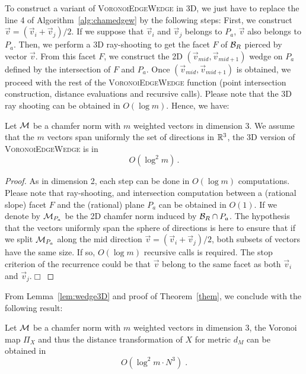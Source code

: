 \documentclass{llncs}
\begin{document}
To construct a variant of \textsc{VoronoiEdgeWedge} in 3D, we just
have to replace the line 4 of Algorithm~\ref{alg:chamedgew} by the
following steps: First, we construct $\vec{v} = (\vec{v}_i +
\vec{v}_j)/2$. If we suppose that $\vec{v}_i$ and $\vec{v}_j$ belongs
to $P_a$, $\vec{v}$ also belongs to $P_a$. Then, we perform a 3D
ray-shooting to get the facet $F$ of $\mathcal{B}_R$ pierced by vector
$\vec{v}$. From this facet $F$, we construct the 2D
$(\vec{v}_{mid},\vec{v}_{mid+1})$ wedge on $P_a$ defined by the
intersection of $F$ and $P_a$. Once $(\vec{v}_{mid},\vec{v}_{mid+1})$
is obtained, we proceed with the rest of the \textsc{VoronoiEdgeWedge}
function (point intersection construction, distance evaluations and
recursive calls). Please note that the 3D ray shooting can be obtained
in $O(\log{m})$. Hence, we have:

\begin{lemma}
\label{lem:wedge3D}
  Let $\mathcal{M}$ be a chamfer norm with $m$ weighted vectors in dimension
  3. We assume that the $m$ vectors span uniformly the set of
  directions in ${\mathbb{R}}^3$, the 3D version of \textsc{VoronoiEdgeWedge} is
  in
  \begin{equation}
    O(\log^2{m})\,.
  \end{equation}
\end{lemma}

\begin{proof}
  As in dimension 2, each step can be done in $O(\log{m})$
  computations. Please note that ray-shooting, and intersection
  computation between a (rational slope) facet $F$ and the (rational)
  plane $P_a$ can be obtained in $O(1)$.  If we denote by $\mathcal{M}_{P_a}$
  be the 2D chamfer norm induced by $\mathcal{B}_R\cap P_a$. The hypothesis that
  the vectors uniformly span the sphere of directions is here to
  ensure that if we split $\mathcal{M}_{P_a}$ along the mid direction
  $\vec{v} =(\vec{v}_i + \vec{v}_j)/2$, both subsets of vectors have the same
  size. If so, $O(\log{m})$ recursive calls is required. The stop
  criterion of the recurrence could be that $\vec{v}$ belong to the
  same facet as both $\vec{v}_i$ and $\vec{v}_j$.$\Box$
\end{proof}

From Lemma~\ref{lem:wedge3D} and proof of Theorem~\ref{them}, we
conclude with the following result:

\begin{theorem}
\label{them2}
  Let $\mathcal{M}$ be a chamfer norm with $m$ weighted vectors in dimension 3,
  the Voronoi map $\Pi_X$ and thus the distance transformation of $X$
  for metric $d_{M}$ can be obtained in
  \begin{equation}
    O(\log^2{m}\cdot N^3)\;.
  \end{equation}
\end{theorem}
\end{document}
